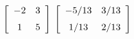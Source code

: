 {$\left[ \begin {array}{cc} -2&3\\\noalign{\medskip}1&5\end {array}
 \right] $
 }
{$\left[ \begin {array}{cc} -5/13&3/13\\\noalign{\medskip}1/13&2/13\end {array}
 \right] $}
